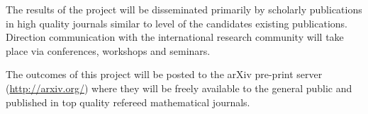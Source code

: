 \documentclass[12pt]{amsart}
\begin{document}
\smallskip{}
\label{sec:orgheadline18}
The results of the project will be disseminated primarily by scholarly publications in high quality journals similar to level of the candidates existing publications. Direction communication with the international research community will take place via conferences, workshops and seminars.

\smallskip{}
\label{sec:orgheadline19}
The outcomes of this project will be posted to the arXiv pre-print server (\url{http://arxiv.org/}) where they will be freely available to the general public and published in top quality refereed mathematical journals.

\printbibliography
\end{document}
